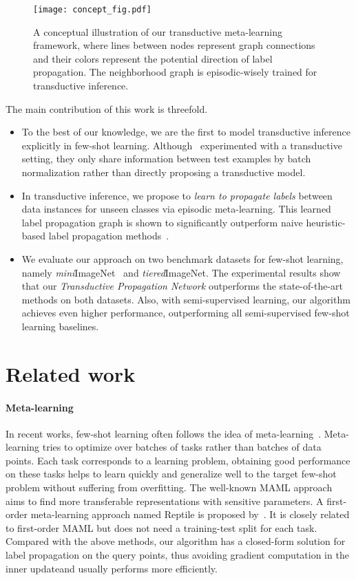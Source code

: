 \documentclass{article} \usepackage{iclr2019_conference,times}
\def\mini{{\textit{mini}ImageNet}}
\def\tiered{{\textit{tiered}ImageNet}}
\begin{document}
\begin{figure}[t]
  \centering
  \texttt{[image: concept\_fig.pdf]}
  \caption{A conceptual illustration of our transductive meta-learning framework, where lines between nodes represent graph connections and their colors represent the potential direction of label propagation. The neighborhood graph is episodic-wisely trained for transductive inference.}
  \label{fig:concept}
\end{figure}

The main contribution of this work is threefold. 

\begin{itemize}
    \item To the best of our knowledge, we are the first to model transductive inference explicitly in few-shot learning. Although~\cite{first-order} experimented with a transductive setting, they only share information between test examples by batch normalization rather than directly proposing a transductive model.
    \item In transductive inference, we propose to \emph{learn to propagate labels} between data instances for unseen classes via  episodic meta-learning. This learned label propagation graph is shown to significantly outperform naive heuristic-based label propagation methods~\citep{labelprop1}.
    \item We evaluate our approach on two benchmark datasets for few-shot learning, namely \mini~ and \tiered. The experimental results show that our \textit{Transductive Propagation Network} outperforms the state-of-the-art methods on both datasets. Also, with semi-supervised learning, our algorithm achieves even higher performance, outperforming all semi-supervised few-shot learning baselines.
\end{itemize}





\section{Related work}

\paragraph{Meta-learning} 
In recent works, few-shot learning often follows the idea of meta-learning~\citep{meta1,meta2}. Meta-learning tries to optimize over batches of tasks rather than batches of data points. Each task corresponds to a learning problem, obtaining good performance on these tasks helps to learn quickly and generalize well to the target few-shot problem without suffering from overfitting. The well-known MAML approach~\citep{maml} aims to find more transferable representations with sensitive parameters. 
A first-order meta-learning approach named Reptile is proposed by~\cite{first-order}. It is closely related to first-order MAML but does not need a training-test split for each task. Compared with the above methods, our algorithm has a closed-form solution for label propagation on the query points, thus avoiding gradient computation in the inner updateand usually performs more efficiently. 
\end{document}
